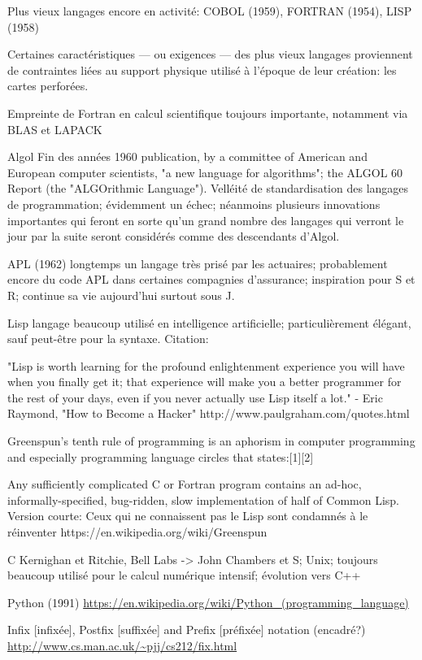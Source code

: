 Plus vieux langages encore en activité: COBOL (1959), FORTRAN (1954),
LISP (1958)

Certaines caractéristiques --- ou exigences --- des plus vieux
langages proviennent de contraintes liées au support physique utilisé
à l'époque de leur création: les cartes perforées.

Empreinte de Fortran en calcul scientifique toujours importante,
notamment via BLAS et LAPACK

Algol Fin des années 1960 publication, by a committee of American and
European computer scientists, "a new language for algorithms"; the
ALGOL 60 Report (the "ALGOrithmic Language"). Velléité de
standardisation des langages de programmation; évidemment un échec;
néanmoins plusieurs innovations importantes qui feront en sorte qu'un
grand nombre des langages qui verront le jour par la suite seront
considérés comme des descendants d'Algol.

APL (1962) longtemps un langage très prisé par les actuaires; probablement
encore du code APL dans certaines compagnies d'assurance; inspiration
pour S et R; continue sa vie aujourd'hui surtout sous J.

Lisp langage beaucoup utilisé en intelligence artificielle;
particulièrement élégant, sauf peut-être pour la syntaxe. Citation:
\emph{}

"Lisp is worth learning for the profound enlightenment experience you will have when you finally get it; that experience will make you a better programmer for the rest of your days, even if you never actually use Lisp itself a lot."
- Eric Raymond, "How to Become a Hacker"
http://www.paulgraham.com/quotes.html

Greenspun's tenth rule of programming is an aphorism in computer programming and especially programming language circles that states:[1][2]

Any sufficiently complicated C or Fortran program contains an ad-hoc,
informally-specified, bug-ridden, slow implementation of half of
Common Lisp.
Version courte: Ceux qui ne connaissent pas le Lisp sont condamnés à
le réinventer
https://en.wikipedia.org/wiki/Greenspun%


C Kernighan et Ritchie, Bell Labs -> John Chambers et S; Unix;
toujours beaucoup utilisé pour le calcul numérique intensif; évolution
vers C++

Python (1991)
\url{https://en.wikipedia.org/wiki/Python_(programming_language)}

Infix [infixée], Postfix [suffixée] and Prefix [préfixée] notation (encadré?)
\url{http://www.cs.man.ac.uk/~pjj/cs212/fix.html}






